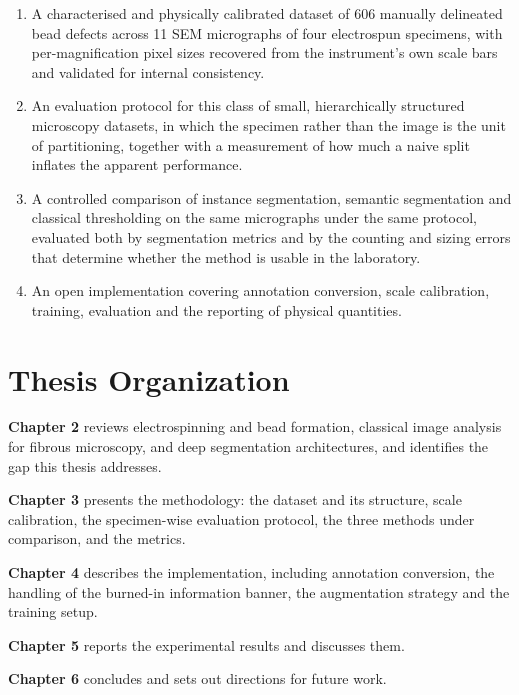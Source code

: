\begin{enumerate}
    \item A characterised and physically calibrated dataset of 606 manually
    delineated bead defects across 11 SEM micrographs of four electrospun specimens,
    with per-magnification pixel sizes recovered from the instrument's own scale bars
    and validated for internal consistency.

    \item An evaluation protocol for this class of small, hierarchically structured
    microscopy datasets, in which the specimen rather than the image is the unit of
    partitioning, together with a measurement of how much a naive split inflates the
    apparent performance.

    \item A controlled comparison of instance segmentation, semantic segmentation and
    classical thresholding on the same micrographs under the same protocol, evaluated
    both by segmentation metrics and by the counting and sizing errors that determine
    whether the method is usable in the laboratory.

    \item An open implementation covering annotation conversion, scale calibration,
    training, evaluation and the reporting of physical quantities.
\end{enumerate}

\section{Thesis Organization}

\textbf{Chapter 2} reviews electrospinning and bead formation, classical image
analysis for fibrous microscopy, and deep segmentation architectures, and identifies
the gap this thesis addresses.

\textbf{Chapter 3} presents the methodology: the dataset and its structure, scale
calibration, the specimen-wise evaluation protocol, the three methods under
comparison, and the metrics.

\textbf{Chapter 4} describes the implementation, including annotation conversion,
the handling of the burned-in information banner, the augmentation strategy and the
training setup.

\textbf{Chapter 5} reports the experimental results and discusses them.

\textbf{Chapter 6} concludes and sets out directions for future work.
